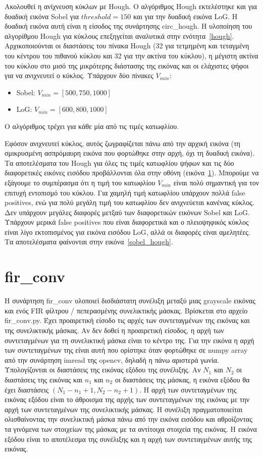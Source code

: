 \documentclass{article}
\begin{document}
Ακολουθεί η ανίχνευση κύκλων με Hough. Ο αλγόριθμος Hough εκτελέστηκε και για
δυαδική εικόνα Sobel για $threshold = 150$ και για την δυαδική εικόνα LoG. 
Η δυαδική εικόνα αυτή είναι η είσοδος της συνάρτησης circ\_hough. 
Η υλοποίηση του αλγορίθμου Hough για κύκλους επεξηγείται αναλυτικά στην 
ενότητα~\ref{hough}. 
Αρχικοποιούνται οι διαστάσεις του πίνακα Hough (32 για τετμημένη και τεταγμένη
του κέντρου του πιθανού κύκλου και 32 για την ακτίνα του κύκλου), η μέγιστη 
ακτίνα του κύκλου στο μισό της μικρότερης διάστασης της εικόνας και οι ελάχιστες
ψήφοι για να ανιχνευτεί ο κύκλος. Υπάρχουν δύο πίνακες $V_{min}$:
\begin{itemize}
    \item Sobel: $V_{min} = \left[500, 750, 1000\right]$
    \item LoG: $V_{min} = \left[600, 800, 1000\right]$
\end{itemize}
Ο αλγόριθμος τρέχει για κάθε μία από τις τιμές κατωφλίου.

Εφόσον ανιχνευτεί κύκλος, αυτός ζωγραφίζεται πάνω από την αρχική εικόνα 
(τη σμικρυσμένη ασπρόμαυρη εικόνα που φορτώθηκε στην αρχή, όχι τη δυαδική εικόνα). 
Τα αποτελέσματα του Hough για όλες τις τιμές κατωφλίου ψήφων και τις δύο διαφορετικές
εικόνες εισόδου προβάλλονται όλα στην οθόνη (εικόνα~\ref{}). Μπορούμε να εξάγουμε
το συμπέρασμα ότι η τιμή του κατωφλίου $V_{min}$ είναι πολύ σημαντική για τον
επιτυχή εντοπισμό του κύκλου. Για χαμηλή τιμή κατωφλίου υπάρχουν πολλά false positives,
ενώ για πολύ μεγάλη τιμή του κατωφλίου δεν ανιχνεύεται κανένας κύκλος. Δεν υπάρχουν
μεγάλες διαφορές μετξαύ των διαφορετικών εικόνων Sobel και LoG. Υπάρχουν μερικά
false positives που είναι διαφορετικά και ο πλειοψηφικός κύκλος είναι λίγο εκτοπισμένος
για εικόνα εισόδου LoG, αλλά οι διαφορές είναι αμελητέες. Τα αποτελέσματα φαίνονται στην
εικόνα~\ref{sobel_hough}.

\section{fir\_conv}
Η συνάρτηση fir\_conv υλοποιεί δισδιάστατη συνέλιξη μεταξύ μιας grayscale
εικόνας και ενός FIR φίλτρου / πεπερασμένης συνελικτικής μάσκας. Βρίσκεται στο 
αρχείο fir\_conv.py. Έχει προαιρετική είσοδο τις αρχές των συντεταγμένων 
της εικόνας και της συνελικτικής μάσκας. Αν δεν δοθεί η προαιρετική είσοδος, η αρχή 
των συντεταγμένων για τη συνελικτική μάσκα είναι το κέντρο της. Για την εικόνα
η αρχή των συντεταγμένων της είναι αυτή που ορίστηκε όταν φορτώθηκε σε numpy 
array από την συνάρτηση imread της opencv, δηλαδή η πάνω αριστερά γωνία.
Υπολογίζονται οι διαστάσεις της εικόνας εξόδου της συνέλιξης.
Αν $N_1$ και $N_2$ οι διαστάσεις της εικόνας και $n_1$ και $n_2$ οι διαστάσεις
της μάσκας, η εικόνα εξόδου θα έχει διαστάσεις $(N_1 - n_1 + 1, N_2 - n_2 + 1)$.
Η αρχή των συντεταγμένων της εικόνας εξόδου είναι το άθροισμα της αρχής των συντεταγμένων της 
εικόνας με την αρχή των συντεταγμένων της συνελικτικής μάσκας. Η συνέλιξη 
πραγματοποιείται ολισθαίνοντας την συνελικτική μάσκα πάνω από την εικόνα εισόδου
και αθροίζοντας τα γινόμενα των στοιχείων της μάσκας με τα αντίτοιχα στοιχεία 
της εικόνας. Η εικόνα εξόδου είναι το αποτέλεσμα της συνέλιξης και η αρχή των 
συντεταγμένων αυτής της εικόνας.
\end{document}
